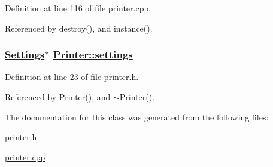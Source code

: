 Definition at line 116 of file printer.cpp.

Referenced by destroy(), and instance().\hypertarget{classPrinter_r0}{
\subsubsection[settings]{\setlength{\rightskip}{0pt plus 5cm}\hyperlink{classSettings}{Settings}$\ast$ \hyperlink{classPrinter_r0}{Printer::settings}}}
\label{classPrinter_r0}


Definition at line 23 of file printer.h.

Referenced by Printer(), and $\sim$Printer().

The documentation for this class was generated from the following files:\begin{CompactItemize}
\item 
\hyperlink{printer_8h}{printer.h}\item 
\hyperlink{printer_8cpp}{printer.cpp}\end{CompactItemize}
